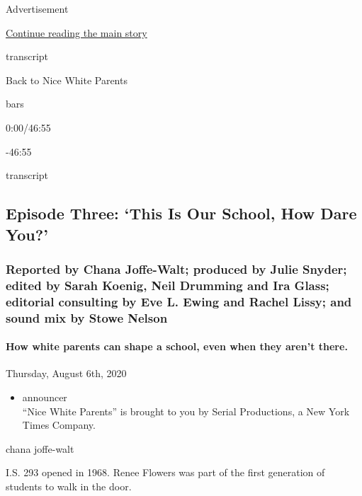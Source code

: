 Advertisement

\protect\hyperlink{after-top}{Continue reading the main story}

transcript

Back to Nice White Parents

bars

0:00/46:55

-46:55

transcript

\hypertarget{episode-three-this-is-our-school-how-dare-you}{%
\subsection{Episode Three: `This Is Our School, How Dare
You?'}\label{episode-three-this-is-our-school-how-dare-you}}

\hypertarget{reported-by-chana-joffe-walt-produced-by-julie-snyder-edited-by-sarah-koenig-neil-drumming-and-ira-glass-editorial-consulting-by-eve-l-ewing-and-rachel-lissy-and-sound-mix-by-stowe-nelson}{%
\subsubsection{Reported by Chana Joffe-Walt; produced by Julie Snyder;
edited by Sarah Koenig, Neil Drumming and Ira Glass; editorial
consulting by Eve L. Ewing and Rachel Lissy; and sound mix by Stowe
Nelson}\label{reported-by-chana-joffe-walt-produced-by-julie-snyder-edited-by-sarah-koenig-neil-drumming-and-ira-glass-editorial-consulting-by-eve-l-ewing-and-rachel-lissy-and-sound-mix-by-stowe-nelson}}

\hypertarget{how-white-parents-can-shape-a-school-even-when-they-arent-there}{%
\paragraph{How white parents can shape a school, even when they aren't
there.}\label{how-white-parents-can-shape-a-school-even-when-they-arent-there}}

Thursday, August 6th, 2020

\begin{itemize}
\tightlist
\item
  announcer\\
  ``Nice White Parents'' is brought to you by Serial Productions, a New
  York Times Company.
\end{itemize}

chana joffe-walt

I.S. 293 opened in 1968. Renee Flowers was part of the first generation
of students to walk in the door.

